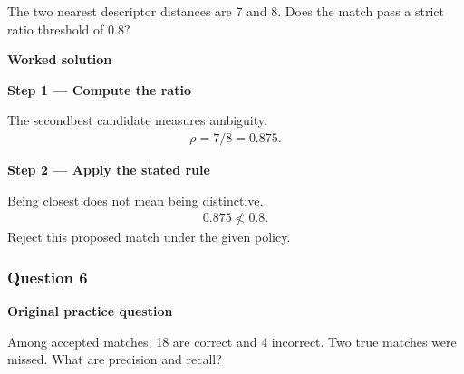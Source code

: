 \documentclass[letterpaper,11pt,english,openany,oneside]{jupyterBook}
\begin{document}
\sphinxAtStartPar
The two nearest descriptor distances are 7 and 8. Does the match pass a strict ratio threshold of 0.8?

\par\medskip

\par\medskip
\textbf{Worked solution}\par\smallskip

\par\medskip{}
{\color{QuizStepRed}\bfseries Step 1 — Compute the ratio}\par\smallskip

\sphinxAtStartPar
{} The second\sphinxhyphen{}best candidate measures ambiguity.
{\color{QuizMathBlue} \begin{equation*}
\begin{split}\rho=7/8=0.875.\end{split}
\end{equation*}}
\par

\par\medskip{}
{\color{QuizStepRed}\bfseries Step 2 — Apply the stated rule}\par\smallskip

\sphinxAtStartPar
{} Being closest does not mean being distinctive.
{\color{QuizMathBlue} \begin{equation*}
\begin{split}0.875\not<0.8.\end{split}
\end{equation*}}
\sphinxAtStartPar
Reject this proposed match under the given policy.

\par

\par\medskip


\subsubsection{Question 6}
\label{\detokenize{lectures/lecture05/tldr:question-6}}
\par\medskip\textbf{Original practice question}\par\smallskip

\sphinxAtStartPar
Among accepted matches, 18 are correct and 4 incorrect. Two true matches were missed. What are precision and recall?

\par\medskip
\end{document}
